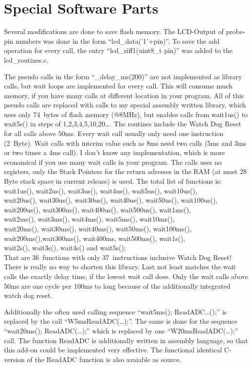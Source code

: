 
\chapter{Special Software Parts}

Several modifications are done to save flash memory.
The LCD-Output of probe-pin numbers was done in the form ``lcd\_data('1'+pin)''.
To save the add operation for every call, the entry ``lcd\_ziff1(uint8\_t pin)''
was added to the lcd\_routines.c.


The pseudo calls in the form ``\_delay\_ms(200)'' are not implemented as library calls,
but wait loops are implemented for every call. This will consume much memory, if you
have many calls at different location in your program.
All of this pseudo calls are replaced with calls to my special assembly written library,
which uses only 74~bytes of flash memory (@8MHz), but enables calls from wait1us() to wait5s()
in steps of 1,2,3,4,5,10,20\dots . The routines  include the Watch Dog Reset for all calls
above 50ms. Every wait call usually only need one instruction (2~Byte). Wait calls
with interim value such as 8ms need two calls (5ms and 3ms or two times a 4ms call).
I don't know any implementation, which is more economical if you use many wait calls in your program.
The calls uses no registers, only the Stack Pointers for the return adresses
in the RAM (at most 28 Byte stack space in current release) is used.
The total list of functions is:\\
wait1us(), wait2us(), wait3us(), wait4us(), wait5us(), wait10us(), \\
wait20us(), wait30us(), wait30us(), wait40us(), wait50us(), wait100us(), \\
wait200us(), wait300us(), wait400us(), wait500us(), wait1ms(),\\
wait2ms(), wait3ms(), wait4ms(), wait5ms(), wait10ms(),\\
wait20ms(), wait30ms(), wait40ms(), wait50ms(), wait100ms(),\\
wait200ms(),wait300ms(), wait400ms, wait500ms(), wait1s(),\\
wait2s(), wait3s(), wait4s() and wait5s();\\
That are 36~functions with only 37~instructions inclusive Watch Dog Reset!
There is really no way to shorten this library.
Last not least matches the wait calls the exactly delay time, if the lowest wait call does.
Only the wait calls above 50ms are one cycle per 100ms to long because of the additionally integrated watch dog reset.


Additionally the often used calling sequence ``wait5ms(); ReadADC\dots();'' is replaced by the call
``W5msReadADC(\dots);''.
The same is done for the sequence ``wait20ms(); ReadADC(\dots);'' which is replaced by one 
``W20msReadADC(\dots);'' call.
The function ReadADC is additionally written in assembly language, so that this add-on could be
implemented very effective. The functional identical C-version of the ReadADC function is
also avaiable as source.
